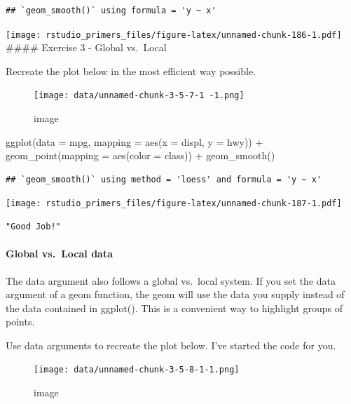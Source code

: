\documentclass[
]{article}
\newenvironment{Shaded}{\begin{snugshade}}{\end{snugshade}}
\newcommand{\AttributeTok}[1]{\textcolor[rgb]{0.77,0.63,0.00}{#1}}
\newcommand{\FunctionTok}[1]{\textcolor[rgb]{0.00,0.00,0.00}{#1}}
\newcommand{\NormalTok}[1]{#1}
\newcommand{\SpecialCharTok}[1]{\textcolor[rgb]{0.00,0.00,0.00}{#1}}
\begin{document}
\begin{verbatim}
## `geom_smooth()` using formula = 'y ~ x'
\end{verbatim}

\texttt{[image: rstudio\_primers\_files/figure-latex/unnamed-chunk-186-1.pdf]}
\#\#\#\# Exercise 3 - Global vs.~Local

Recreate the plot below in the most efficient way possible.

\begin{figure}
\centering
\texttt{[image: data/unnamed-chunk-3-5-7-1 -1.png]}
\caption{image}
\end{figure}

\begin{Shaded}
\begin{Highlighting}[]
\FunctionTok{ggplot}\NormalTok{(}\AttributeTok{data =}\NormalTok{ mpg, }\AttributeTok{mapping =} \FunctionTok{aes}\NormalTok{(}\AttributeTok{x =}\NormalTok{ displ, }\AttributeTok{y =}\NormalTok{ hwy)) }\SpecialCharTok{+}
  \FunctionTok{geom\_point}\NormalTok{(}\AttributeTok{mapping =} \FunctionTok{aes}\NormalTok{(}\AttributeTok{color =}\NormalTok{ class)) }\SpecialCharTok{+}
  \FunctionTok{geom\_smooth}\NormalTok{()}
\end{Highlighting}
\end{Shaded}

\begin{verbatim}
## `geom_smooth()` using method = 'loess' and formula = 'y ~ x'
\end{verbatim}

\texttt{[image: rstudio\_primers\_files/figure-latex/unnamed-chunk-187-1.pdf]}

\begin{verbatim}
"Good Job!"
\end{verbatim}

\hypertarget{global-vs.-local-data}{%
\paragraph{Global vs.~Local data}\label{global-vs.-local-data}}

The data argument also follows a global vs.~local system. If you set the
data argument of a geom function, the geom will use the data you supply
instead of the data contained in ggplot(). This is a convenient way to
highlight groups of points.

Use data arguments to recreate the plot below. I've started the code for
you.

\begin{figure}
\centering
\texttt{[image: data/unnamed-chunk-3-5-8-1-1.png]}
\caption{image}
\end{figure}
\end{document}

